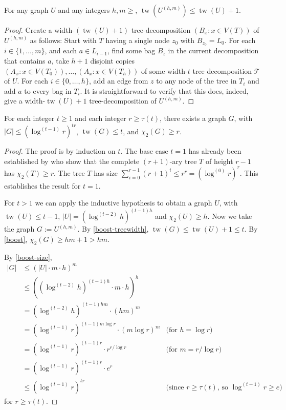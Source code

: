 \documentclass[kpfonts]{patmorin}
\DeclareMathOperator{\tw}{tw}
\newcommand{\trn}{\chi_2}
\theoremstyle{named}
\begin{document}
\begin{lem}\label{boost-treewidth}
    For any graph $U$ and any integers $h,m\ge$, $\tw(U^{(h,m)})\le \tw(U)+1$.
\end{lem}

\begin{proof}
  Create a width-$(\tw(U)+1)$ tree-decomposition $(B_x:x\in V(T))$ of $U^{(h,m)}$ as follows: Start with $T$ having a single node $z_0$ with $B_{z_0}=L_0$.  For each $i\in\{1,\ldots,m\}$, and each $a\in L_{i-1}$, find some bag $B_z$ in the current decomposition that contains $a$, take $h+1$ disjoint copies $(A_x:x\in V(T_0)),\ldots,(A_x:x\in V(T_h))$ of some width-$t$ tree decomposition $\mathcal{T}$ of $U$.  For each $i\in\{0,\ldots,h\}$, add an edge from $z$ to any node of the tree in $T_i$ and add $a$ to every bag in $T_i$.  It is straightforward to verify that this does, indeed, give a width-$\tw(U)+1$ tree-decomposition of $U^{(h,m)}$.
\end{proof}


\begin{lem}\label{treewidth-lower-bound}
    For each integer $t\ge 1$ and each integer $r\ge \tau(t)$, there exists a graph $G$, with $|G|\le (\log^{(t-1)}r)^{t r}$, $\tw(G)\le t$, and $\trn(G)\ge r$.
\end{lem}

\begin{proof}
    The proof is by induction on $t$.  The base case $t=1$ has already been established by \citet{karpas.neiman.ea:on} who show that the complete $(r+1)$-ary tree $T$ of height $r-1$ has $\trn(T)\ge r$.  The tree $T$ has size $\sum_{i=0}^{r-1} (r+1)^i \le r^r=(\log^{(0)}r)^{r}$.  This establishes the result for $t=1$.

    For $t>1$ we can apply the inductive hypothesis to obtain a graph $U$,     with $\tw(U)\le t-1$, $|U|=(\log^{(t-2)} h)^{(t-1)h}$ and $\trn(U)\ge h$.
    Now we take the graph $G:=U^{(h,m)}$.  By \cref{boost-treewidth}, $\tw(G)\le \tw(U)+1\le t$.  By \cref{boost},
    $\trn(G)\ge hm+1 > hm$.

   By \cref{boost-size},
   \begin{align*}
        |G| & \le (|U|\cdot m\cdot h)^{m} \\
        & \le \left((\log^{(t-2)} h)^{(t-1)h}\cdot m\cdot h\right)^{h} \\
        & = (\log^{(t-2)} h)^{(t-1)hm}\cdot (hm)^{m} \\
        & = (\log^{(t-1)} r)^{(t-1)m\log r}\cdot (m\log r)^{m}
        & \text{(for $h=\log r$)}\\
        & = (\log^{(t-1)} r)^{(t-1)r}\cdot r^{r/\log r}
        & \text{(for $m = r/\log r$)}\\
        & = (\log^{(t-1)} r)^{(t-1)r}\cdot e^{r} \\
        & \le (\log^{(t-1)} r)^{tr} & \text{(since $r\ge \tau(t)$, so $\log^{(t-1)} r\ge e$)}
   \end{align*}
   for $r\ge \tau(t)$.
\end{proof}
\end{document}
